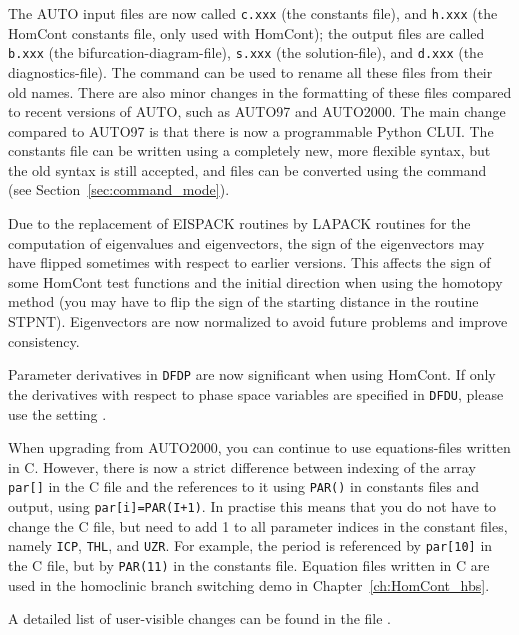 \documentclass[12pt]{report}
\begin{document}
The {\cal AUTO} input files are now called 
{\tt c.xxx} (the constants file),
and
{\tt h.xxx} (the {\cal HomCont} constants file, only used with {\cal HomCont});
the output files are called
{\tt b.xxx} (the bifurcation-diagram-file),
{\tt s.xxx} (the solution-file),
and
{\tt d.xxx} (the diagnostics-file).
The command  can be used to rename all these files from
their old names.
There are also minor changes in the formatting of these files 
compared to recent versions of {\cal AUTO}, such as {\cal AUTO97} 
and {\cal AUTO2000}.
The main change compared to {\cal AUTO97} is that there is now a
programmable Python CLUI. The constants file can be written using
a completely new, more flexible syntax, but the old syntax is
still accepted, and files can be converted using the command
 (see Section~\ref{sec:command_mode}).

Due to the replacement of EISPACK routines by LAPACK routines for the
computation of eigenvalues and eigenvectors, the sign of the
eigenvectors may have flipped sometimes with respect to earlier
versions. This affects the sign of some {\cal HomCont}
test functions and the initial direction when using the homotopy
method (you may have to flip the sign of the starting distance
in the routine STPNT). Eigenvectors are now normalized to avoid
future problems and improve consistency.

Parameter derivatives in {\tt DFDP} are now significant when using {\cal
HomCont}. If only the derivatives with respect to phase space variables
are specified in {\tt DFDU}, please use the setting .

When upgrading from {\cal AUTO2000}, you can continue to use
equations-files written in C. However, there is now a strict
difference between indexing of the array {\tt par[]} in the
C file and the references to it using {\tt PAR()} in constants
files and output, using {\tt par[i]=PAR(I+1)}. In practise this
means that you do not have to change the C file, but need to
add 1 to all parameter indices in the constant files, namely
{\tt ICP}, {\tt THL}, and {\tt UZR}. For example,
the period is referenced by {\tt par[10]} in the C file,
but by {\tt PAR(11)} in the constants file. Equation files
written in C are used in the homoclinic branch switching
demo in Chapter~\ref{ch:HomCont_hbs}.
 
A detailed list of user-visible changes can be found in the file
.
\end{document}
